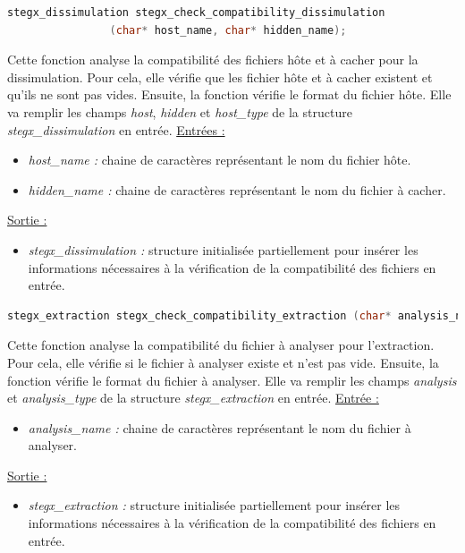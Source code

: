 \documentclass[11pt]{article}
\begin{document}
\begin{lstlisting}[language=c]
stegx_dissimulation stegx_check_compatibility_dissimulation 
                (char* host_name, char* hidden_name);
\end{lstlisting}

Cette fonction analyse la compatibilité des fichiers hôte et à cacher pour
la dissimulation. 
Pour cela, elle vérifie que les fichier hôte et à cacher existent et qu'ils 
ne sont pas vides. Ensuite, la fonction vérifie le format du fichier hôte. 
Elle va remplir les champs \textit{host}, \textit{hidden} et \textit{host\_type} 
de la structure \textit{stegx\_dissimulation} en entrée. 
\newline
\underline{Entrées :}
\begin{itemize}
\item \textit{host\_name :} chaine de caractères représentant le nom du fichier hôte.
\item \textit{hidden\_name :} chaine de caractères représentant le nom du 
fichier à cacher. 
\end{itemize}
\underline{Sortie :}
\begin{itemize}
\item \textit{stegx\_dissimulation :} structure initialisée partiellement pour insérer les 
informations nécessaires à la vérification de la compatibilité des fichiers 
en entrée. 
\newline 
\end{itemize}

\begin{lstlisting}[language=c]
stegx_extraction stegx_check_compatibility_extraction (char* analysis_name);
\end{lstlisting}

Cette fonction analyse la compatibilité du fichier à analyser pour l'extraction. 
Pour cela, elle vérifie si le fichier à analyser existe et n'est pas vide. 
Ensuite, la fonction vérifie le format du fichier à analyser. 
Elle va remplir les champs \textit{analysis} et \textit{analysis\_type} 
de la structure \textit{stegx\_extraction} en entrée. 
\newline
\underline{Entrée :}
\begin{itemize}
\item \textit{analysis\_name :} chaine de caractères représentant le nom du fichier 
à analyser.
\end{itemize}
\underline{Sortie :}
\begin{itemize}
\item \textit{stegx\_extraction :} structure initialisée partiellement pour insérer les 
informations nécessaires à la vérification de la compatibilité des fichiers 
en entrée. 
\newline 
\end{itemize}
\end{document}
